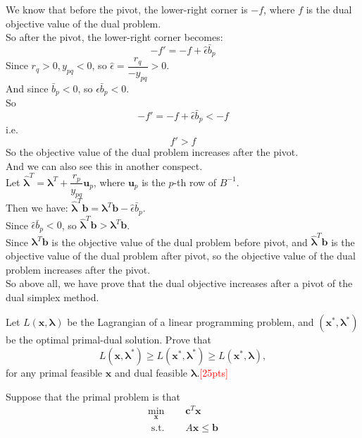 \documentclass[10pt]{article}
\newenvironment{problem}[2][Problem]{\begin{trivlist}
\item[\hskip \labelsep {\bfseries #1}\hskip \labelsep {\bfseries #2.}]}{\end{trivlist}}
\begin{document}
We know that before the pivot, the lower-right corner is $-f$, where $f$ is the dual objective value of the dual problem.\\
So after the pivot, the lower-right corner becomes:\\
$$-f'=-f+\hat{\epsilon}\bar{b}_p$$
Since $r_q>0,y_{pq}<0$, so $\hat{\epsilon}=\dfrac{r_q}{-y_{pq}}>0$. \\
And since $\bar{b}_p<0$, so $\hat{\epsilon}\bar{b}_p<0$.\\
So
$$-f'= -f +\hat{\epsilon}\bar{b}_p < -f$$
i.e.
$$f'>f$$
So the objective value of the dual problem increases after the pivot.\\
And we can also see this in another conspect.\\
Let $\hat{\bm{\lambda}}^T=\bm{\lambda}^T+\dfrac{r_p}{y_{pq}}\bm{u}_p$, where $\bm{u}_p$ is the $p$-th row of $B^{-1}$.\\
Then we have: $\hat{\bm{\lambda}}^T\bm{b}=\bm{\lambda}^T\bm{b}-\hat{\epsilon}\bar{b}_p$.\\
Since $\hat{\epsilon}\bar{b}_p<0$, so $\hat{\bm{\lambda}}^T\bm{b}>\bm{\lambda}^T\bm{b}$.\\
Since $\bm{\lambda}^T\bm{b}$ is the objective value of the dual problem before pivot, and $\hat{\bm{\lambda}}^T\bm{b}$ is the objective value of the dual problem after pivot, so the objective value of the dual problem increases after the pivot.\\

So above all, we have prove that the dual objective increases after a pivot of the dual simplex method.\\

\newpage


\begin{problem}{3}
    Let $L(\bm{x}, \bm{\lambda})$ be the Lagrangian of a linear programming problem, and $(\bm{x}^*, \bm{\lambda}^*)$ be the optimal primal-dual solution. Prove that $$L(\bm{x}, \bm{\lambda}^*) \geq L(\bm{x}^*, \bm{\lambda}^*) \geq L(\bm{x}^*, \bm{\lambda}),$$ for any primal feasible $\bm{x}$ and dual feasible $\bm{\lambda}$.\textcolor{red}{[25pts]}
\end{problem}

Suppose that the primal problem is that
\begin{equation}
\begin{aligned}
\min_{\bm{x}} \quad & \bm{c}^T\bm{x} \\
\text { s.t. } \quad & A\bm{x} \leq \bm{b} \\
\end{aligned}
\end{equation}
\end{document}
